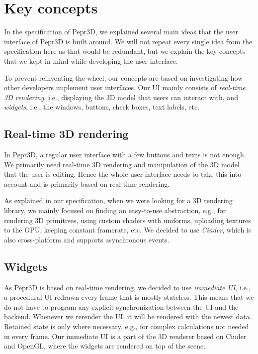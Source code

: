 \section{Key concepts}

In the specification of Pepr3D, we explained several main ideas that the user interface of Pepr3D is built around.
We will not repeat every single idea from the specification here as that would be redundant, but we explain the key concepts that we kept in mind while developing the user interface.

To prevent reinventing the wheel, our concepts are based on investigating how other developers implement user interfaces.
Our UI mainly consists of \emph{real-time 3D rendering}, i.e., displaying the 3D model that users can interact with, and \emph{widgets}, i.e., the windows, buttons, check boxes, text labels, etc.

\subsection{Real-time 3D rendering}

In Pepr3D, a regular user interface with a few buttons and texts is not enough.
We primarily need real-time 3D rendering and manipulation of the 3D model that the user is editing.
Hence the whole user interface needs to take this into account and is primarily based on real-time rendering.

As explained in our specification, when we were looking for a 3D rendering library, we mainly focused on finding an easy-to-use abstraction, e.g., for rendering 3D primitives, using custom shaders with uniforms, uploading textures to the GPU, keeping constant framerate, etc.
We decided to use \emph{Cinder}, which is also cross-platform and supports asynchronous events.

\subsection{Widgets}

As Pepr3D is based on real-time rendering, we decided to use \emph{immediate UI}, i.e., a procedural UI redrawn every frame that is mostly stateless.
This means that we do not have to program any explicit synchronization between the UI and the backend.
Whenever we rerender the UI, it will be rendered with the newest data.
Retained state is only where necessary, e.g., for complex calculations not needed in every frame.
Our immediate UI is a part of the 3D renderer based on Cinder and OpenGL, where the widgets are rendered on top of the scene.

